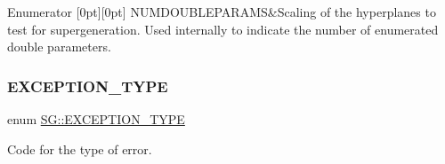 \begin{DoxyEnumFields}{Enumerator}
[0pt][0pt]{}\mbox{\label{namespaceSG_ac2f86c953fcec4419ac86538d9d314b6a5abae44509e90e4b4033308e5e581265}} 
N\+U\+M\+D\+O\+U\+B\+L\+E\+P\+A\+R\+A\+MS&Scaling of the hyperplanes to test for supergeneration. Used internally to indicate the number of enumerated double parameters. \\
\hline

\end{DoxyEnumFields}
\mbox{\label{namespaceSG_a671df7c720746d1e853deee02bad6411}} 
\subsubsection{\texorpdfstring{E\+X\+C\+E\+P\+T\+I\+O\+N\+\_\+\+T\+Y\+PE}{EXCEPTION\_TYPE}}
{\footnotesize\ttfamily enum \hyperlink{namespaceSG_a671df7c720746d1e853deee02bad6411}{S\+G\+::\+E\+X\+C\+E\+P\+T\+I\+O\+N\+\_\+\+T\+Y\+PE}}



Code for the type of error. 

